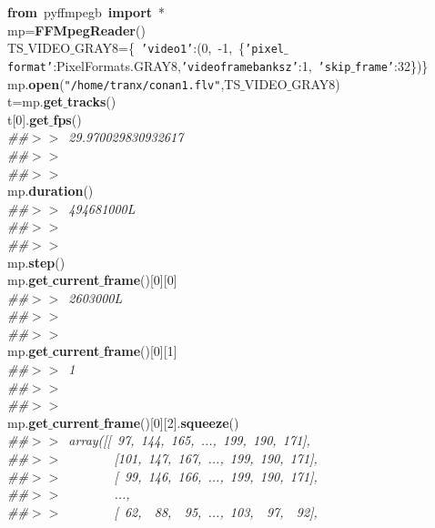 \noindent
\mbox{}\textbf{from}\ pyffmpegb\ \textbf{import}\ * \\
\mbox{}mp=\textbf{FFMpegReader}() \\
\mbox{}TS$\_$VIDEO$\_$GRAY8=\{\ \texttt{'video1'}:(0,\ -1,\ \{\texttt{'pixel$\_$format'}:PixelFormats.GRAY8,\texttt{'videoframebanksz'}:1,\ \texttt{'skip$\_$frame'}:32\})\} \\
\mbox{}mp.\textbf{open}(\texttt{"{}/home/tranx/conan1.flv"{}},TS$\_$VIDEO$\_$GRAY8) \\
\mbox{}t=mp.\textbf{get$\_$tracks}() \\
\mbox{}t[0].\textbf{get$\_$fps}() \\
\mbox{}\textit{\#\#$>$$>$\ 29.970029830932617} \\
\mbox{}\textit{\#\#$>$$>$\ } \\
\mbox{}\textit{\#\#$>$$>$\ } \\
\mbox{}mp.\textbf{duration}() \\
\mbox{}\textit{\#\#$>$$>$\ 494681000L} \\
\mbox{}\textit{\#\#$>$$>$\ } \\
\mbox{}\textit{\#\#$>$$>$\ } \\
\mbox{}mp.\textbf{step}() \\
\mbox{}mp.\textbf{get$\_$current$\_$frame}()[0][0] \\
\mbox{}\textit{\#\#$>$$>$\ 2603000L} \\
\mbox{}\textit{\#\#$>$$>$\ } \\
\mbox{}\textit{\#\#$>$$>$\ } \\
\mbox{}mp.\textbf{get$\_$current$\_$frame}()[0][1] \\
\mbox{}\textit{\#\#$>$$>$\ 1} \\
\mbox{}\textit{\#\#$>$$>$\ } \\
\mbox{}\textit{\#\#$>$$>$\ } \\
\mbox{}mp.\textbf{get$\_$current$\_$frame}()[0][2].\textbf{squeeze}() \\
\mbox{}\textit{\#\#$>$$>$\ array([[\ 97,\ 144,\ 165,\ ...,\ 199,\ 190,\ 171],} \\
\mbox{}\textit{\#\#$>$$>$\ \ \ \ \ \ \ \ [101,\ 147,\ 167,\ ...,\ 199,\ 190,\ 171],} \\
\mbox{}\textit{\#\#$>$$>$\ \ \ \ \ \ \ \ [\ 99,\ 146,\ 166,\ ...,\ 199,\ 190,\ 171],} \\
\mbox{}\textit{\#\#$>$$>$\ \ \ \ \ \ \ \ ...,\ } \\
\mbox{}\textit{\#\#$>$$>$\ \ \ \ \ \ \ \ [\ 62,\ \ 88,\ \ 95,\ ...,\ 103,\ \ 97,\ \ 92],} \\
